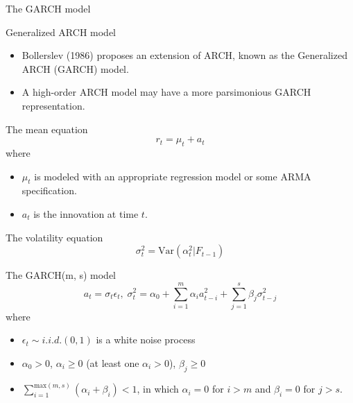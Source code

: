 \documentclass[presentation,10pt]{beamer}
\newcommand{\var}{\mathrm{Var}}
\begin{document}
\begin{frame}[label={sec:orgbf7fd8b}]{The GARCH model}
\begin{block}{Generalized ARCH model}
\begin{itemize}
\item Bollerslev (1986) proposes an extension of ARCH, known as the
Generalized ARCH (GARCH) model.

\item A high-order ARCH model may have a more parsimonious GARCH
representation.
\end{itemize}
\end{block}

\begin{block}{The mean equation}
\[ r_t = \mu_t + a_t \]
where 
\begin{itemize}
\item \(\mu_t\) is modeled with an appropriate regression model or some
ARMA specification.
\item \(a_t\) is the innovation at time \(t\).
\end{itemize}
\end{block}

\begin{block}{The volatility equation}
\[ \sigma^2_t = \var(\alpha^2_t | F_{t-1}) \]
\end{block}
\end{frame}

\begin{frame}[label={sec:org8d57190}]{The GARCH(m, s) model}
\begin{equation}
\label{eq:garchms}
a_t = \sigma_t \epsilon_t,\; \sigma^2_t = \alpha_0 + \sum_{i=1}^m \alpha_i a^2_{t-i} + \sum_{j=1}^s \beta_j \sigma^2_{t-j}
\end{equation}
where
\begin{itemize}
\item \(\epsilon_t \sim i.i.d.(0, 1)\) is a white noise process
\item \(\alpha_0 > 0\), \(\alpha_i \geq 0\) (at least one \(\alpha_i > 0\)),
\(\beta_j \geq 0\)
\item \(\sum_{i=1}^{\mathrm{max}(m,s)}(\alpha_i + \beta_i) < 1\), in which \(\alpha_i
  = 0\) for \(i > m\) and \(\beta_i = 0\) for \(j > s\).
\end{itemize}
\end{frame}
\end{document}
